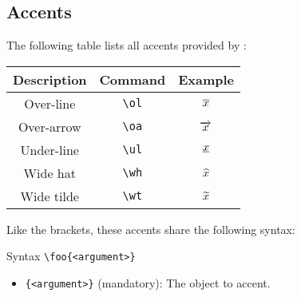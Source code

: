 \subsection{Accents}

The following table lists all accents provided by \asdiasty:

\begin{table}[H]
    \centering
    \begin{tabular}{|c|c|c|}
        \hline
        \textbf{Description} & \textbf{Command} & \textbf{Example} \\ \hline \hline
        Over-line & \verb|\ol| & $\overline{x}$ \\ \hline
        Over-arrow & \verb|\oa| & $\overrightarrow{x}$ \\ \hline
        Under-line & \verb|\ul| & $\underline{x}$ \\ \hline
        Wide hat & \verb|\wh| & $\widehat{x}$ \\ \hline
        Wide tilde & \verb|\wt| & $\widetilde{x}$ \\ \hline
    \end{tabular}
\end{table}

Like the brackets, these accents share the following syntax:

\begin{myframe}{Syntax}
    \verb|\foo{<argument>}|
    \begin{itemize}
        \item \verb|{<argument>}| (mandatory): The object to accent.
    \end{itemize}
\end{myframe}